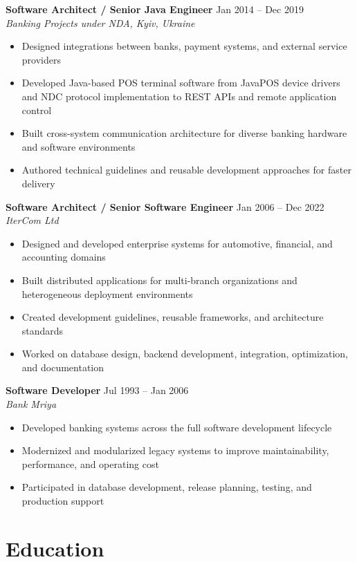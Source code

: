 \documentclass[10pt,a4paper]{article}
\begin{document}
\textbf{Software Architect / Senior Java Engineer} \hfill Jan 2014 -- Dec 2019 \\
\textit{Banking Projects under NDA, Kyiv, Ukraine}

\begin{itemize}
\item Designed integrations between banks, payment systems, and external service providers
\item Developed Java-based POS terminal software from JavaPOS device drivers and NDC protocol implementation to REST APIs and remote application control
\item Built cross-system communication architecture for diverse banking hardware and software environments
\item Authored technical guidelines and reusable development approaches for faster delivery
\end{itemize}

\textbf{Software Architect / Senior Software Engineer} \hfill Jan 2006 -- Dec 2022 \\
\textit{IterCom Ltd}

\begin{itemize}
\item Designed and developed enterprise systems for automotive, financial, and accounting domains
\item Built distributed applications for multi-branch organizations and heterogeneous deployment environments
\item Created development guidelines, reusable frameworks, and architecture standards
\item Worked on database design, backend development, integration, optimization, and documentation
\end{itemize}

\textbf{Software Developer} \hfill Jul 1993 -- Jan 2006 \\
\textit{Bank Mriya}

\begin{itemize}
\item Developed banking systems across the full software development lifecycle
\item Modernized and modularized legacy systems to improve maintainability, performance, and operating cost
\item Participated in database development, release planning, testing, and production support
\end{itemize}

\section*{Education}
\end{document}
